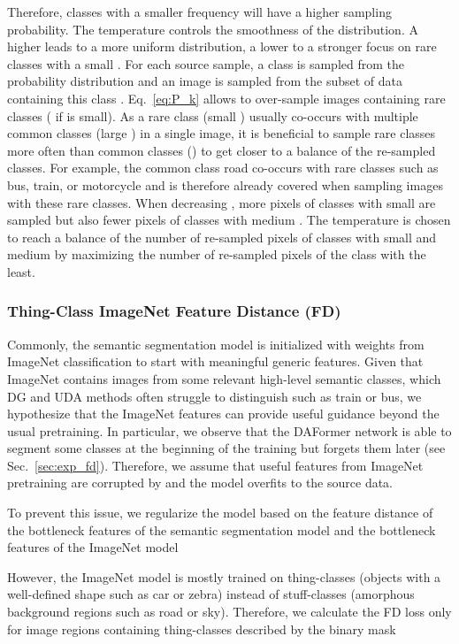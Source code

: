 \documentclass[journal,compsoc]{IEEEtran}
\begin{document}
Therefore, classes with a smaller frequency will have a higher sampling probability. The temperature  controls the smoothness of the distribution. A higher  leads to a more uniform distribution, a lower  to a stronger focus on rare classes with a small .
For each source sample, a class is sampled from the probability distribution  and an image is sampled from the subset of data containing this class .
Eq.~\ref{eq:P_k} allows to over-sample images containing rare classes ( if  is small). 
As a rare class (small ) usually co-occurs with multiple common classes (large ) in a single image, it is beneficial to sample rare classes more often than common classes () to get closer to a balance of the re-sampled classes.
For example, the common class road co-occurs with rare classes such as bus, train, or motorcycle and is therefore already covered when sampling images with these rare classes.
When decreasing , more pixels of classes with small  are sampled but also fewer pixels of classes with medium . The temperature  is chosen to reach a balance of the number of re-sampled pixels of classes with small and medium  by maximizing the number of re-sampled pixels of the class with the least.


\subsubsection{Thing-Class ImageNet Feature Distance (FD)}
\label{sec:methods_feature_distance}
Commonly, the semantic segmentation model  is initialized with weights from ImageNet classification to start with meaningful generic features. Given that ImageNet contains images from some relevant high-level semantic classes, which DG and UDA methods often struggle to distinguish such as train or bus, we hypothesize that the ImageNet features can provide useful guidance beyond the usual pretraining. In particular, we observe that the DAFormer network is able to segment some classes at the beginning of the training but forgets them later (see Sec.~\ref{sec:exp_fd}).
Therefore, we assume that useful features from ImageNet pretraining are corrupted by  and the model overfits to the source data.

To prevent this issue, we regularize the model based on the feature distance  of the bottleneck features  of the semantic segmentation model  and the bottleneck features  of the ImageNet model

However, the ImageNet model is mostly trained on thing-classes (objects with a well-defined shape such as car or zebra) instead of stuff-classes (amorphous background regions such as road or sky). Therefore, we calculate the FD loss only for image regions containing thing-classes  described by the binary mask 
\end{document}
